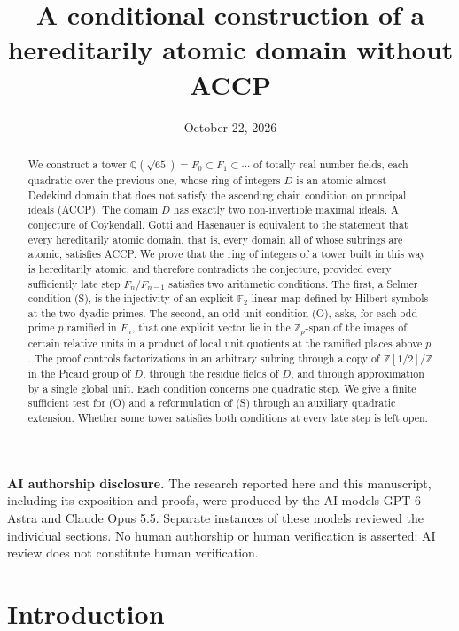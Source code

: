 \documentclass[11pt]{article}
\title{A conditional construction of a hereditarily atomic domain without ACCP}
\author{}
\date{October 22, 2026}
\theoremstyle{plain}
\theoremstyle{definition}
\theoremstyle{remark}
\newcommand{\Z}{\mathbb Z}
\newcommand{\Q}{\mathbb Q}
\newcommand{\F}{\mathbb F}
\begin{document}
\maketitle
\begin{abstract}
We construct a tower $\Q(\sqrt{65})=F_0\subset F_1\subset\cdots$ of totally
real number fields, each quadratic over the previous one, whose ring of
integers $D$ is an atomic almost Dedekind domain that does not satisfy the
ascending chain condition on principal ideals (ACCP).  The domain $D$ has
exactly two non-invertible maximal ideals.  A conjecture of Coykendall,
Gotti and Hasenauer is equivalent to the statement that every hereditarily
atomic domain, that is, every domain all of whose subrings are atomic,
satisfies ACCP.  We prove that the ring of integers of a tower built in
this way is hereditarily atomic, and therefore contradicts the conjecture,
provided every sufficiently late step $F_n/F_{n-1}$ satisfies two
arithmetic conditions.  The first, a Selmer condition (S), is the
injectivity of an explicit $\F_2$-linear map defined by Hilbert symbols at
the two dyadic primes.  The second, an odd unit condition (O), asks, for
each odd prime $p$ ramified in $F_n$, that one explicit vector lie in the
$\Z_p$-span of the images of certain relative units in a product of local
unit quotients at the ramified places above $p$.  The proof controls factorizations in an
arbitrary subring through a copy of $\Z[1/2]/\Z$ in the Picard group of
$D$, through the residue fields of $D$, and through approximation by a
single global unit.  Each condition concerns one quadratic step.  We give a
finite sufficient test for (O) and a reformulation of (S) through an
auxiliary quadratic extension.  Whether some tower satisfies both
conditions at every late step is left open.
\end{abstract}
\noindent\textbf{AI authorship disclosure.}
The research reported here and this manuscript, including its exposition
and proofs, were produced by the AI models GPT-6 Astra and Claude Opus 5.5.
Separate instances of these models reviewed the individual sections.  No
human authorship or human verification is asserted; AI review does not
constitute human verification.

\tableofcontents




\section{Introduction}\label{sec:introduction}
\end{document}
